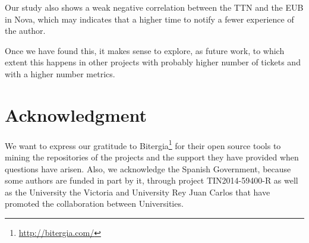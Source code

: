 \documentclass[10pt, conference]{IEEEtran}
\begin{document}
Our study also shows a weak negative correlation between the TTN and the EUB in Nova, which may indicates that a higher time to notify a fewer experience of the author. 

Once we have found this, it makes sense to explore, as future work, to which extent this happens in other projects with probably higher number of tickets and with a higher number metrics.

\section*{Acknowledgment}


We want to express our gratitude to Bitergia\footnote{\url{http://bitergia.com/}} for their open source tools to mining the repositories of the projects and the support they have provided when questions have arisen. Also, we acknowledge the Spanish Government, because some authors are funded in part by it, through project TIN2014-59400-R as well as the University the Victoria and University Rey Juan Carlos that have promoted the collaboration between Universities.



%
%
%




 


\end{document}
